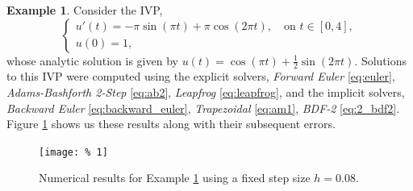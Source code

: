 \documentclass[12pt, twoside]{report}
\theoremstyle{plain}
\theoremstyle{definition}
\theoremstyle{definition}
\newtheorem{example}{Example}[chapter]
\begin{document}
        \begin{example}
        \label{4_example_1}
            Consider the IVP,
            \begin{equation}
            \label{eq:4_ex_1}
                \begin{cases}
                    u'(t) = -\pi \sin(\pi t) + \pi \cos(2\pi t), \quad 
                    \text{on } t \in [0,4],\\
                    u(0) = 1,
                \end{cases}
            \end{equation}
            whose analytic solution is given by $u(t)=\cos(\pi t)+ 
            \frac{1}{2}\sin(2\pi t)$. Solutions to this IVP were computed
            using the explicit solvers, \textit{Forward Euler} \eqref{eq:euler},
            \textit{Adams-Bashforth 2-Step} \eqref{eq:ab2}, \textit{Leapfrog}
            \eqref{eq:leapfrog}, and the implicit solvers, 
            \textit{Backward Euler} \eqref{eq:backward_euler}, 
            \textit{Trapezoidal} \eqref{eq:am1}, \textit{BDF-2} 
            \eqref{eq:2_bdf2}. Figure \ref{4_graphs_1} shows us these results
            along with their subsequent errors. 
        \end{example}
        \begin{figure}[H]
            \centering
                \texttt{[image: \%
                1]}
                \caption{Numerical results for Example \ref{4_example_1}
                using a fixed step size $h=0.08$.}
                \label{4_graphs_1}
        \end{figure}
\end{document}
